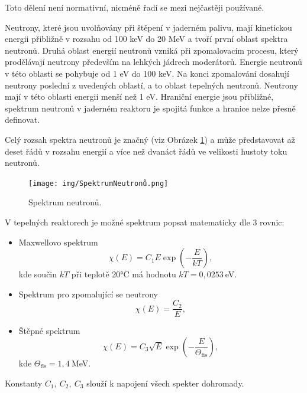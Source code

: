 Toto dělení není normativní, nicméně řadí se mezi nejčastěji používané.

Neutrony, které jsou uvolňovány při štěpení v jaderném palivu, mají kinetickou energii přibližně v rozsahu od 100 keV do 20 MeV a tvoří první oblast spektra neutronů. Druhá oblast energií neutronů vzniká při zpomalovacím procesu, který prodělávají neutrony především na lehkých jádrech moderátorů. Energie neutronů v této oblasti se pohybuje od 1 eV do 100 keV. Na konci zpomalování dosahují neutrony poslední z uvedených oblastí, a to oblast tepelných neutronů. Neutrony mají v této oblasti energii menší než 1 eV. Hraniční energie jsou přibližné, spektrum neutronů v jaderném reaktoru je spojitá funkce a hranice nelze přesně definovat.

Celý rozsah spektra neutronů je značný (viz Obrázek \ref{fig:SpektrumNeutronů}) a může představovat až deset řádů v rozsahu energií a více než dvanáct řádů ve velikosti hustoty toku neutronů.

\begin{figure}[H]
    \centering
    \texttt{[image: img/SpektrumNeutronů.png]}
    \caption{Spektrum neutronů.}
    \label{fig:SpektrumNeutronů}
\end{figure}

V tepelných reaktorech je možné spektrum popsat matematicky dle 3 rovnic:

\begin{itemize}
    \item  Maxwellovo spektrum
    \begin{equation*}
        \chi(E) = C_1 E \exp\left(-\frac{E}{kT}\right), 
    \end{equation*}
    kde součin $kT$ při teplotě 20°C má hodnotu $kT = 0,0253\ $eV.
    
    \item  Spektrum pro zpomalující se neutrony
    \begin{equation*}
        \chi(E) = \frac{C_2}{E}, 
    \end{equation*}
    
    \item  Štěpné spektrum
    \begin{equation*}
        \chi(E) = C_3 \sqrt{E} \exp\left(-\frac{E}{\Theta_\text{fis}}\right), 
    \end{equation*}
    kde $\Theta_\text{fis} =1,4\ $MeV.
\end{itemize}

Konstanty $C_1,\ C_2,\ C_3$ slouží k napojení všech spekter dohromady.

